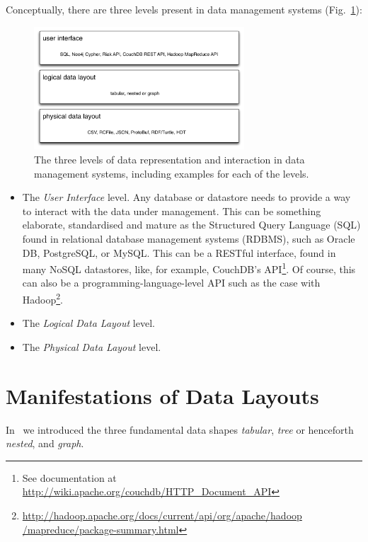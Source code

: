 \documentclass{llncs}
\begin{document}
Conceptually, there are three levels present in data management systems
(Fig.~\ref{fig:data-layers}):
\begin{figure}[h!]
\centering
\includegraphics[width=0.7\textwidth]{data-layers}
\caption{The three levels of data representation and interaction in data 
management systems, including examples for each of the levels.}
\label{fig:data-layers}
\end{figure}
\begin{itemize}
\item The \emph{User Interface} level. Any database or datastore needs 
to provide a way to interact with the data under management. This can be 
something elaborate, standardised and mature as the Structured Query Language 
(SQL) found in relational database management systems (RDBMS), such as 
Oracle DB, PostgreSQL, or MySQL. This can be a RESTful interface, found in many 
NoSQL datastores, like, for example, CouchDB's API\footnote{See documentation at
\url{http://wiki.apache.org/couchdb/HTTP_Document_API}}. Of course, this can 
also be a programming-language-level API such as the case with
Hadoop\footnote{\url{http://hadoop.apache.org/docs/current/api/org/apache/hadoop
/mapreduce/package-summary.html}}.
\item The \emph{Logical Data Layout} level.
\item The \emph{Physical Data Layout} level.
\end{itemize}

\section{Manifestations of Data Layouts}
\label{sec:mani}
In~\cite{Hausenblas:arxiv2012} we introduced the three fundamental data shapes
\emph{tabular}, \emph{tree} or henceforth \emph{nested}, and \emph{graph}.
\end{document}
